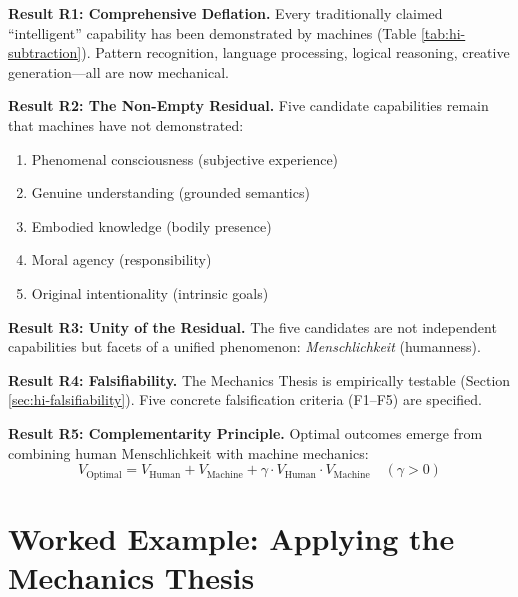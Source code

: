 \begin{tcolorbox}[colback=green!5!white, colframe=green!75!black,
    title=\textbf{Key Results Summary}]

\textbf{Result R1: Comprehensive Deflation.}
Every traditionally claimed ``intelligent'' capability has been demonstrated by machines (Table \ref{tab:hi-subtraction}). Pattern recognition, language processing, logical reasoning, creative generation---all are now mechanical.

\textbf{Result R2: The Non-Empty Residual.}
Five candidate capabilities remain that machines have not demonstrated:
\begin{enumerate}[nosep]
    \item Phenomenal consciousness (subjective experience)
    \item Genuine understanding (grounded semantics)
    \item Embodied knowledge (bodily presence)
    \item Moral agency (responsibility)
    \item Original intentionality (intrinsic goals)
\end{enumerate}

\textbf{Result R3: Unity of the Residual.}
The five candidates are not independent capabilities but facets of a unified phenomenon: \textit{Menschlichkeit} (humanness).

\textbf{Result R4: Falsifiability.}
The Mechanics Thesis is empirically testable (Section \ref{sec:hi-falsifiability}). Five concrete falsification criteria (F1--F5) are specified.

\textbf{Result R5: Complementarity Principle.}
Optimal outcomes emerge from combining human Menschlichkeit with machine mechanics:
\begin{equation}
V_{\text{Optimal}} = V_{\text{Human}} + V_{\text{Machine}} + \gamma \cdot V_{\text{Human}} \cdot V_{\text{Machine}} \quad (\gamma > 0)
\end{equation}

\end{tcolorbox}


\section{Worked Example: Applying the Mechanics Thesis}
\label{sec:hi-worked-example}

